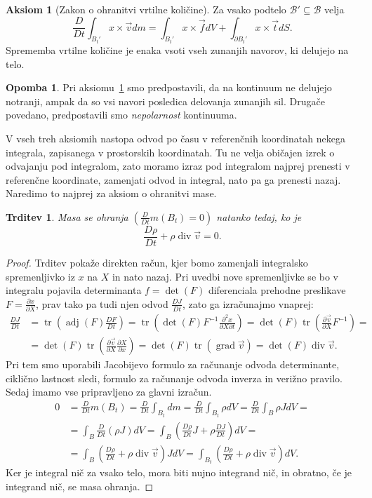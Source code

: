 \documentclass[12pt,a4paper,twoside]{article}
\theoremstyle{definition} %
\newtheorem{opomba}[definicija]{Opomba}
\newtheorem{aksiom}{Aksiom}
\theoremstyle{plain} %
\newtheorem{trditev}[definicija]{Trditev}
\numberwithin{equation}{section}
\newcommand{\B}{\mathcal{B}}
\renewcommand{\div}{\operatorname{div}}
\newcommand{\grad}{\operatorname{grad}}
\newcommand{\dpar}[2]{\ensuremath{\frac{\partial #1}{\partial #2}}}
\newcommand{\DD}[2]{\ensuremath{\frac{D #1}{D #2}}}
\newcommand{\DDt}[1]{\DD{#1}{t}}
\newcommand{\vv}{\vec{v}}
\newcommand{\vt}{\vec{t}}
\newcommand{\vf}{\vec{f}}
\newcommand{\vX}{X}
\newcommand{\vx}{x}
\DeclareMathOperator{\tr}{tr}
\begin{document}
\begin{aksiom}[Zakon o ohranitvi vrtilne količine]
  \label{aks:vrt}
  Za vsako podtelo $\B' \subseteq \B$ velja
  \begin{equation}
    \DDt{}\int_{B_t'}\vx \times \vv dm = \int_{B_t'} \vx \times \vf dV +
    \int_{\partial B_t'} \vx\times\vt dS.
    \label{eq:vrt}
  \end{equation}
  Sprememba vrtilne količine je enaka vsoti vseh zunanjih navorov, ki delujejo
  na telo.
\end{aksiom}
\begin{opomba}
  Pri aksiomu~\ref{aks:vrt} smo predpostavili, da na kontinuum ne delujejo
  notranji, ampak da so vsi navori posledica delovanja zunanjih sil. Drugače
  povedano, predpostavili smo \emph{nepolarnost} kontinuuma.
\end{opomba}

V vseh treh aksiomih nastopa odvod po času v referenčnih koordinatah nekega
integrala, zapisanega v prostorskih koordinatah. Tu ne velja običajen izrek o
odvajanju pod integralom, zato moramo izraz pod integralom najprej prenesti v
referenčne koordinate, zamenjati odvod in integral, nato pa ga prenesti nazaj.
Naredimo to najprej za aksiom o ohranitvi mase.
\begin{trditev} Masa se ohranja $(\DDt{}m(B_t) = 0)$ natanko tedaj, ko je
  \begin{equation}
    \DDt\rho + \rho\div\vv = 0.
    \label{eq:ohr-masa}
  \end{equation}
\end{trditev}
\begin{proof}
Trditev pokaže direkten račun, kjer bomo zamenjali integralsko spremenljivko iz
$\vx$ na $\vX$ in nato nazaj. Pri uvedbi nove spremenljivke se bo v integralu
pojavila determinanta $f = \det(F)$ diferenciala prehodne preslikave $F =
\dpar{\vx}{\vX}$, prav tako pa tudi njen odvod $\DDt{J}$, zato ga izračunajmo vnaprej:
\begin{align*}
  \DDt J &= \tr\left(\operatorname{adj}(F) \DDt{F}\right) =
  \tr\left(\det(F)F^{-1} \dpar{^2\vx}{\vX\partial t}\right) =
  \det(F)\tr\left(\dpar{\vv}{\vX}F^{-1}\right) = \\ &=
  \det(F)\tr\left(\dpar{\vv}{\vX}\dpar{\vX}{\vx}\right) =
  \det(F)\tr\left(\grad \vv\right) =
  \det(F)\div \vv.
\end{align*}
Pri tem smo uporabili Jacobijevo formulo za računanje odvoda
determinante, ciklično lastnost sledi, formulo za računanje odvoda inverza in verižno pravilo.
Sedaj imamo vse pripravljeno za glavni izračun.
\begin{align*}
  0 &= \DDt{}m(B_t) =
  \DDt{} \int_{B_t} dm =
  \DDt{} \int_{B_t} \rho dV =
  \DDt{} \int_{B} \rho J dV =\\ &=
  \int_{B} \DDt{}(\rho J) dV =
  \int_{B}\left( \DDt{\rho} J + \rho \DDt{J} \right)dV = \\ &=
  \int_{B}\left( \DDt{\rho}  + \rho \div\vv\right) J dV =
  \int_{B_t}\left( \DDt{\rho}  + \rho \div\vv\right) dV.
\end{align*}
Ker je integral nič za vsako telo, mora biti nujno integrand nič, in obratno, če
je integrand nič, se masa ohranja.
\end{proof}
\end{document}
